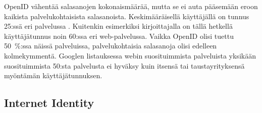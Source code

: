 \documentclass[english,gradu]{tktltiki}
\begin{document}
OpenID vähentää salasanojen kokonaismäärää, mutta se ei auta pääsemään eroon kaikista palvelukohtaisista
salasanoista. Keskimääräisellä käyttäjällä on tunnus 25:ssä eri palvelussa \cite{study_of_passwords_07}.
Kuitenkin esimerkiksi kirjoittajalla on tällä hetkellä käyttäjätunnus noin 60:ssa eri web-palvelussa. Vaikka
OpenID olisi tuettu 50~\%:ssa näissä palveluissa, palvelukohtaisia salasanoja olisi edelleen kolmekymmentä.
Googlen listauksessa webin suosituimmista palveluista \cite{google_top1000_sites} yksikään suosituimmista
50:sta palvelusta ei hyväksy kuin itsensä tai taustayrityksensä myöntämän käyttäjätunnuksen.

%
%
%
%





\subsection{Internet Identity} %
\label{sub:internet_identity}
\end{document}
